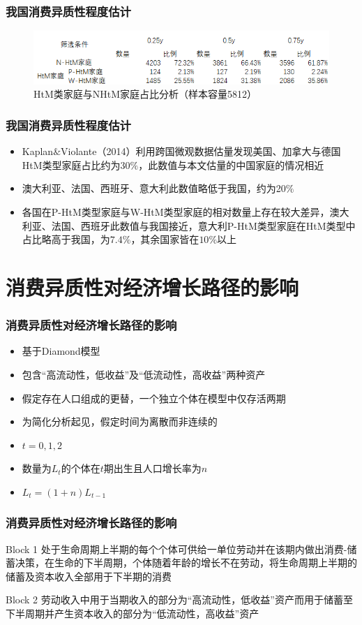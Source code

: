 \documentclass{beamer}
\begin{document}
\begin{frame}
\frametitle{我国消费异质性程度估计}
\begin{figure}
\includegraphics[width=0.8\linewidth]{data_2}
\caption{HtM类家庭与NHtM家庭占比分析（样本容量5812）}
\end{figure}
\end{frame}

\begin{frame}
\frametitle{我国消费异质性程度估计}
\begin{itemize}
\item Kaplan$\&$Violante（2014）利用跨国微观数据估量发现美国、加拿大与德国HtM类型家庭占比约为30$\%$，此数值与本文估量的中国家庭的情况相近
\item 澳大利亚、法国、西班牙、意大利此数值略低于我国，约为20$\%$
\item 各国在P-HtM类型家庭与W-HtM类型家庭的相对数量上存在较大差异，澳大利亚、法国、西班牙此数值与我国接近，意大利P-HtM类型家庭在HtM类型中占比略高于我国，为$7.4\%$，其余国家皆在$10\%$以上
\end{itemize} 
\end{frame}

\section{消费异质性对经济增长路径的影响}

\begin{frame}
\frametitle{消费异质性对经济增长路径的影响}
\begin{itemize}
\item 基于Diamond模型
\item 包含“高流动性，低收益”及“低流动性，高收益”两种资产
\item 假定存在人口组成的更替，一个独立个体在模型中仅存活两期
\item 为简化分析起见，假定时间为离散而非连续的
\item $t=0,1,2$
\item 数量为$L_{t}$的个体在$t$期出生且人口增长率为$n$
\item $L_{t}=(1+n)L_{t-1}$  
\end{itemize}
\end{frame}

\begin{frame}
\frametitle{消费异质性对经济增长路径的影响}
\begin{block}{Block 1}
处于生命周期上半期的每个个体可供给一单位劳动并在该期内做出消费-储蓄决策，在生命的下半周期，个体随着年龄的增长不在劳动，将生命周期上半期的储蓄及资本收入全部用于下半期的消费
\end{block}   

\begin{block}{Block 2}
劳动收入中用于当期收入的部分为“高流动性，低收益”资产而用于储蓄至下半周期并产生资本收入的部分为“低流动性，高收益”资产
\end{block}
\end{frame}
\end{document}
